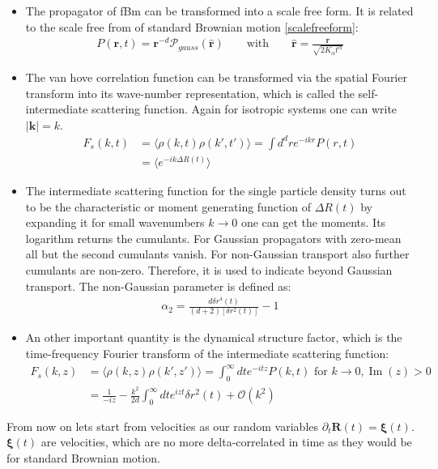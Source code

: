\documentclass[
  a4paper,BCOR10mm,oneside,
  bibtotoc,idxtotoc,
  headsepline,footsepline,%
  fleqn,openbib
]{scrbook}
\begin{document}
\begin{itemize}
\item The propagator of fBm can be transformed into a scale free form. It is related to the scale free from of standard Brownian motion \cref{scalefreeform}:
\begin{align}
P(\bm{r},t)= \bm{r}^{-d} \mathcal{P}_{gauss}(\hat{\bm{r}})  \qquad \text{with} \qquad \hat{\bm{r}} = \frac{\bm{r}}{\sqrt{2 K_{\alpha} t^{\alpha}}} \label{scalefreeformfrac}
\end{align}
\item The van hove correlation function can be transformed via the spatial Fourier transform into its wave-number representation, which is called the self-intermediate scattering function. Again for isotropic systems one can write $|\bm{k}|=k$.
\begin{align}
 F_{s}(k,t)&=\langle\rho(k,t) \rho(k',t')\rangle=\int d^{d}r e^{-i k r} P(r,t) \\
 &=\langle e^{-i k \Delta R(t)} \rangle
\end{align}
\item 
The intermediate scattering function for the single particle density turns out to be the characteristic or moment generating function of $\Delta R(t)$ by expanding it for small wavenumbers $k \rightarrow 0$ one can get the moments. Its logarithm returns the cumulants. For Gaussian propagators with zero-mean all but the second cumulants vanish. For non-Gaussian transport also further cumulants are non-zero. Therefore, it is used to indicate beyond Gaussian transport. The non-Gaussian parameter is defined as:
\begin{align}
 \alpha_2=\frac{d \delta r^{4}(t)}{(d+2) [\delta r^{2}(t)]}-1 \label{nongaussian2}
\end{align}
\item
An other important quantity is the dynamical structure factor, which is the time-frequency Fourier transform of the intermediate scattering function:
\begin{align}
 F_{s}(k,z)&=\langle\rho(k,z) \rho(k',z')\rangle=\int_{0}^{\infty} d t e^{-i t z} P(k,t) \text{ for } k \rightarrow 0 , \operatorname{Im}(z) > 0 \label{dynamicstructurfactor}\\
 &= \frac{1}{-iz}-\frac{k^2}{2d}\int_{0}^{\infty} d t e^{izt} \delta r^2 (t) + \mathcal{O}(k^2)
\end{align}

\end{itemize}
From now on lets start from velocities as our random variables $\partial_t \bm{R}(t)=\bm{\xi}(t)$. $\bm{\xi}(t)$ are velocities, which are no more delta-correlated in time as they would be for standard Brownian motion. 
\end{document}
